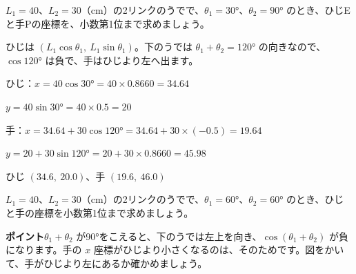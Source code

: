 \begin{reidai}
$L_1=40$、$L_2=30$（cm）の2リンクのうでで、$\theta_1=\ang{30}$、$\theta_2=\ang{90}$ のとき、ひじEと手Pの座標を、小数第1位まで求めましょう。\par
\kangaekata ひじは $(L_1\cos\theta_1,\ L_1\sin\theta_1)$。下のうでは $\theta_1+\theta_2=\ang{120}$ の向きなので、$\cos\ang{120}$ は負で、手はひじより左へ出ます。\par
\shiki ひじ：$x=40\cos\ang{30}=40\times0.8660=34.64$\par
\hspace*{5.4\zw}$y=40\sin\ang{30}=40\times0.5=20$\par
\hspace*{2.6\zw}手：$x=34.64+30\cos\ang{120}=34.64+30\times(-0.5)=19.64$\par
\hspace*{4.6\zw}$y=20+30\sin\ang{120}=20+30\times0.8660=45.98$\par
\kotae ひじ $(34.6,\ 20.0)$、手 $(19.6,\ 46.0)$
\end{reidai}

\begin{jibun}
$L_1=40$、$L_2=30$（cm）の2リンクのうでで、$\theta_1=\ang{60}$、$\theta_2=\ang{60}$ のとき、ひじと手の座標を小数第1位まで求めましょう。
\end{jibun}
\textbf{ポイント}\quad $\theta_1+\theta_2$ が\ang{90}をこえると、下のうでは左上を向き、$\cos(\theta_1+\theta_2)$ が負になります。手の $x$ 座標がひじより小さくなるのは、そのためです。図をかいて、手がひじより左にあるか確かめましょう。


